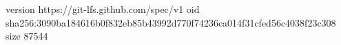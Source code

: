 version https://git-lfs.github.com/spec/v1
oid sha256:3090ba184616b0f832eb85b43992d770f74236ca014f31cfed56c4038f23c308
size 87544
